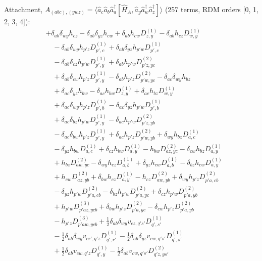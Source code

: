 \noindent Attachment, $A_{(abc),(ywz)}=\langle \hat a_c\hat a_b\hat a_a^\dagger[\hat H_A,\hat a_y\hat a_w^\dagger \hat a_z^\dagger]\rangle$ (257 terms, RDM orders [0, 1, 2, 3, 4]):
\begin{align*}
&+\delta_{ab}\delta_{wy}h_{cz}-\delta_{ab}\delta_{yz}h_{cw}+\delta_{ab}h_{cw}D^{(1)}_{z,y}-\delta_{ab}h_{cz}D^{(1)}_{w,y} \\
&\quad -\delta_{ab}\delta_{wy}h_{p'z}D^{(1)}_{p',c}+\delta_{ab}\delta_{yz}h_{p'w}D^{(1)}_{p',c} \\
&\quad -\delta_{ab}\delta_{cz}h_{p'w}D^{(1)}_{p',y}+\delta_{ab}h_{p'w}D^{(2)}_{p'z,yc} \\
&\quad +\delta_{ab}\delta_{cw}h_{p'z}D^{(1)}_{p',y}-\delta_{ab}h_{p'z}D^{(2)}_{p'w,yc}-\delta_{ac}\delta_{wy}h_{bz} \\
&\quad +\delta_{ac}\delta_{yz}h_{bw}-\delta_{ac}h_{bw}D^{(1)}_{z,y}+\delta_{ac}h_{bz}D^{(1)}_{w,y} \\
&\quad +\delta_{ac}\delta_{wy}h_{p'z}D^{(1)}_{p',b}-\delta_{ac}\delta_{yz}h_{p'w}D^{(1)}_{p',b} \\
&\quad +\delta_{ac}\delta_{bz}h_{p'w}D^{(1)}_{p',y}-\delta_{ac}h_{p'w}D^{(2)}_{p'z,yb} \\
&\quad -\delta_{ac}\delta_{bw}h_{p'z}D^{(1)}_{p',y}+\delta_{ac}h_{p'z}D^{(2)}_{p'w,yb}+\delta_{wy}h_{bz}D^{(1)}_{a,c} \\
&\quad -\delta_{yz}h_{bw}D^{(1)}_{a,c}+\delta_{cz}h_{bw}D^{(1)}_{a,y}-h_{bw}D^{(2)}_{az,yc}-\delta_{cw}h_{bz}D^{(1)}_{a,y} \\
&\quad +h_{bz}D^{(2)}_{aw,yc}-\delta_{wy}h_{cz}D^{(1)}_{a,b}+\delta_{yz}h_{cw}D^{(1)}_{a,b}-\delta_{bz}h_{cw}D^{(1)}_{a,y} \\
&\quad +h_{cw}D^{(2)}_{az,yb}+\delta_{bw}h_{cz}D^{(1)}_{a,y}-h_{cz}D^{(2)}_{aw,yb}+\delta_{wy}h_{p'z}D^{(2)}_{p'a,cb} \\
&\quad -\delta_{yz}h_{p'w}D^{(2)}_{p'a,cb}-\delta_{bz}h_{p'w}D^{(2)}_{p'a,yc}+\delta_{cz}h_{p'w}D^{(2)}_{p'a,yb} \\
&\quad +h_{p'w}D^{(3)}_{p'az,ycb}+\delta_{bw}h_{p'z}D^{(2)}_{p'a,yc}-\delta_{cw}h_{p'z}D^{(2)}_{p'a,yb} \\
&\quad -h_{p'z}D^{(3)}_{p'aw,ycb}+\tfrac12\delta_{ab}\delta_{wy}v_{cz,q's'}D^{(1)}_{q',s'} \\
&\quad -\tfrac12\delta_{ab}\delta_{wy}v_{cr',q'z}D^{(1)}_{q',r'}-\tfrac12\delta_{ab}\delta_{yz}v_{cw,q's'}D^{(1)}_{q',s'} \\
&\quad +\tfrac12\delta_{ab}v_{cw,q'z}D^{(1)}_{q',y}-\tfrac12\delta_{ab}v_{cw,q's'}D^{(2)}_{q'z,ys'} \\

\end{align*}
